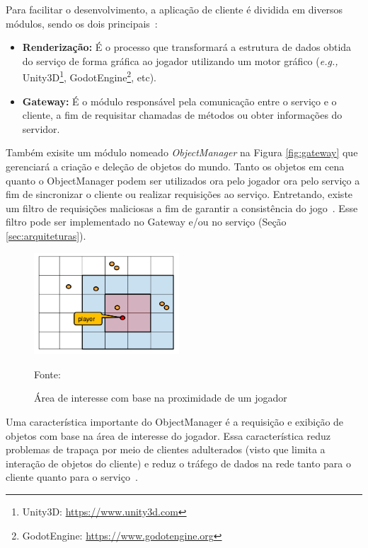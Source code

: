 Para facilitar o desenvolvimento, a aplicação de cliente é dividida em diversos módulos, sendo os dois principais~\cite{albion_online_unite}:



\begin{itemize}
  \item \textbf{Renderização:} É o processo que transformará a estrutura de dados obtida do serviço de forma gráfica ao jogador utilizando um motor gráfico (\textit{e.g.,} Unity3D\footnote{Unity3D: \url{https://www.unity3d.com}}, GodotEngine\footnote{GodotEngine: \url{https://www.godotengine.org}}, etc).
  \item \textbf{Gateway:} É o módulo responsável pela comunicação entre o serviço e o cliente, a fim de requisitar chamadas de métodos ou obter informações do servidor.
\end{itemize}



Também exisite um módulo nomeado \textit{ObjectManager} na Figura \ref{fig:gateway} que gerenciará a criação e deleção de objetos do mundo.
%
Tanto os objetos em cena quanto o ObjectManager podem ser utilizados ora pelo jogador ora pelo serviço a fim de sincronizar o cliente ou realizar requisições ao serviço.
%
Entretando, existe um filtro de requisições maliciosas a fim de garantir a consistência do jogo~\cite{albion_online_unite}.
%
Esse filtro pode ser implementado no Gateway e/ou no serviço (Seção \ref{sec:arquiteturas}).



\begin{figure}[htb!]
\caption{Área de interesse com base na proximidade de um jogador}
\label{fig:proximidade}
\includegraphics[height=3.8cm]{img/cap2/proximidade.png}
\centering

Fonte:~\cite{albion_online_unite}
\end{figure}



Uma característica importante do ObjectManager é a requisição e exibição de objetos com base na área de interesse do jogador.
%
Essa característica reduz problemas de trapaça por meio de clientes adulterados (visto que limita a interação de objetos do cliente) e reduz o tráfego de dados na rede tanto para o cliente quanto para o serviço~\cite{albion_online_unite, stephenclarkewillson2017}.



